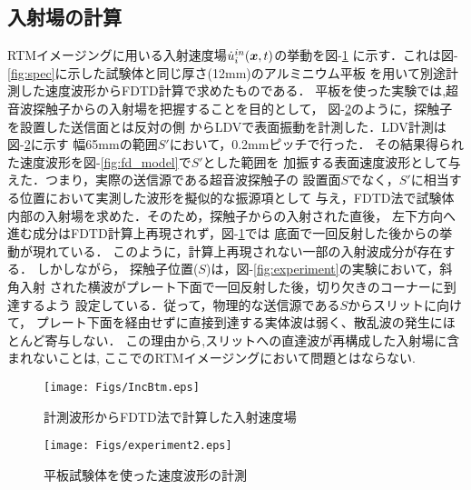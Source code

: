 \subsection{入射場の計算}
RTMイメージングに用いる入射速度場$\dot{u}_i^{in}(\boldsymbol{x},t)$の挙動を{\rm 図}-\ref{fig:inc_btm}
に示す．これは{\rm 図}-\ref{fig:spec}に示した試験体と同じ厚さ(12mm)のアルミニウム平板
を用いて別途計測した速度波形からFDTD計算で求めたものである．
平板を使った実験では,超音波探触子からの入射場を把握することを目的として，
{\rm 図}-\ref{fig:experiment2}のように，探触子を設置した送信面とは反対の側
からLDVで表面振動を計測した．LDV計測は{\rm 図}-\ref{fig:experiment2}に示す
幅65mmの範囲$S'$において，0.2mmピッチで行った．
その結果得られた速度波形を{\rm 図}-\ref{fig:fd_model}で$S'$とした範囲を
加振する表面速度波形として与えた．つまり，実際の送信源である超音波探触子の
設置面$S$でなく，$S'$に相当する位置において実測した波形を擬似的な振源項として
与え，FDTD法で試験体内部の入射場を求めた．そのため，探触子からの入射された直後，
左下方向へ進む成分はFDTD計算上再現されず，{\rm 図}-\ref{fig:inc_btm}では
底面で一回反射した後からの挙動が現れている． 
このように，計算上再現されない一部の入射波成分が存在する． 
しかしながら，
探触子位置($S$)は，{\rm 図}-\ref{fig:experiment}の実験において，斜角入射
された横波がプレート下面で一回反射した後，切り欠きのコーナーに到達するよう
設定している．従って，物理的な送信源である$S$からスリットに向けて，
プレート下面を経由せずに直接到達する実体波は弱く、散乱波の発生にほとんど寄与しない．
この理由から,スリットへの直達波が再構成した入射場に含まれないことは,
ここでのRTMイメージングにおいて問題とはならない.
\begin{figure}[htb]
\centering
	\texttt{[image: Figs/IncBtm.eps]}
	\caption{計測波形からFDTD法で計算した入射速度場}
	\label{fig:inc_btm}
\end{figure}
\begin{figure}[htb]
\centering
	\texttt{[image: Figs/experiment2.eps]}
	\caption{平板試験体を使った速度波形の計測}
	\label{fig:experiment2}
\end{figure}
